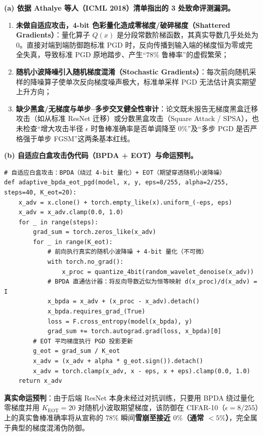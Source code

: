 
\textbf{(a) 依据 Athalye 等人（ICML 2018）清单指出的 3 处致命评测漏洞。}
\begin{enumerate}
  \item \textbf{未做自适应攻击，4-bit 色彩量化造成零梯度/破碎梯度（Shattered Gradients）}：量化算子 $Q(x)$ 是分段常数阶梯函数，其真实导数几乎处处为 $0$。直接对端到端防御跑标准 PGD 时，反向传播到输入端的梯度恒为零或完全失真，导致标准 PGD 原地踏步、产生“$78\%$ 鲁棒率”的虚假繁荣；
  \item \textbf{随机小波降噪引入随机梯度混淆（Stochastic Gradients）}：每次前向随机采样的降噪算子使单次反向梯度噪声极大，标准单采样 PGD 无法估计真实期望上升方向；
  \item \textbf{缺少黑盒/无梯度与单步--多步交叉健全性审计}：论文既未报告无梯度黑盒迁移攻击（如从标准 ResNet 迁移）或分数黑盒攻击（Square Attack / SPSA），也未检查“增大攻击半径 $\epsilon$ 时鲁棒准确率是否单调降至 $0\%$”及“多步 PGD 是否严格强于单步 FGSM”这两条基本红线。
\end{enumerate}

\textbf{(b) 自适应白盒攻击伪代码（BPDA + EOT）与命运预判。}
\begin{lstlisting}
# 自适应白盒攻击：BPDA（绕过 4-bit 量化）+ EOT（期望穿透随机小波降噪）
def adaptive_bpda_eot_pgd(model, x, y, eps=8/255, alpha=2/255, steps=40, K_eot=20):
    x_adv = x.clone() + torch.empty_like(x).uniform_(-eps, eps)
    x_adv = x_adv.clamp(0.0, 1.0)
    for _ in range(steps):
        grad_sum = torch.zeros_like(x_adv)
        for _ in range(K_eot):
            # 前向执行真实的随机小波降噪 + 4-bit 量化（不可微）
            with torch.no_grad():
                x_proc = quantize_4bit(random_wavelet_denoise(x_adv))
            # BPDA 直通估计器：将反向导数近似为恒等映射 d(x_proc)/d(x_adv) = I
            x_bpda = x_adv + (x_proc - x_adv).detach()
            x_bpda.requires_grad_(True)
            loss = F.cross_entropy(model(x_bpda), y)
            grad_sum += torch.autograd.grad(loss, x_bpda)[0]
        # EOT 平均梯度执行 PGD 投影更新
        g_eot = grad_sum / K_eot
        x_adv = (x_adv + alpha * g_eot.sign()).detach()
        x_adv = torch.clamp(x_adv, x - eps, x + eps).clamp(0.0, 1.0)
    return x_adv
\end{lstlisting}
\textbf{真实命运预判}：由于后端 ResNet 本身未经过对抗训练，只要用 BPDA 绕过量化零梯度并用 $K_{\text{EOT}} = 20$ 对随机小波取期望梯度，该防御在 CIFAR-10（$\epsilon = 8/255$）上的真实鲁棒准确率将从宣称的 $78\%$ 瞬间\textbf{雪崩至接近 $0\%$（通常 $< 5\%$）}，完全属于典型的梯度混淆伪防御。

